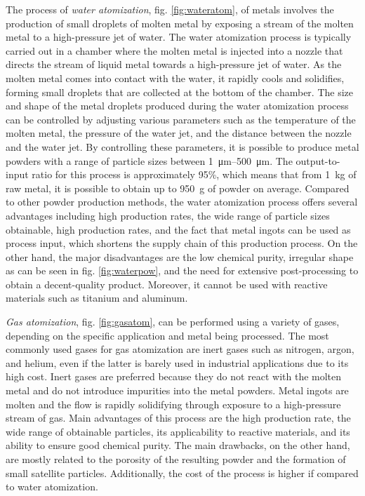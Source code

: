 The process of \emph{water atomization}, fig. \ref{fig:wateratom}, of metals involves the production of small droplets of molten metal by exposing a stream of the molten metal to a high-pressure jet of water. The water atomization process is typically carried out in a chamber where the molten metal is injected into a nozzle that directs the stream of liquid metal towards a high-pressure jet of water. As the molten metal comes into contact with the water, it rapidly cools and solidifies, forming small droplets that are collected at the bottom of the chamber. The size and shape of the metal droplets produced during the water atomization process can be controlled by adjusting various parameters such as the temperature of the molten metal, the pressure of the water jet, and the distance between the nozzle and the water jet. By controlling these parameters, it is possible to produce metal powders with a range of particle sizes between \SIrange[range-phrase = --]{1}{500}{\micro\metre}. The output-to-input ratio for this process is approximately 95\%, which means that from \SI{1}{\kilo\gram} of raw metal, it is possible to obtain up to \SI{950}{\gram} of powder on average. Compared to other powder production methods, the water atomization process offers several advantages including high production rates, the wide range of particle sizes obtainable, high production rates, and the fact that metal ingots can be used as process input, which shortens the supply chain of this production process. On the other hand, the major disadvantages are the low chemical purity, irregular shape as can be seen in fig. \ref{fig:waterpow}, and the need for extensive post-processing to obtain a decent-quality product. Moreover, it cannot be used with reactive materials such as titanium and aluminum.

\emph{Gas atomization}, fig. \ref{fig:gasatom}, can be performed using a variety of gases, depending on the specific application and metal being processed. The most commonly used gases for gas atomization are inert gases such as nitrogen, argon, and helium, even if the latter is barely used in industrial applications due to its high cost. Inert gases are preferred because they do not react with the molten metal and do not introduce impurities into the metal powders. Metal ingots are molten and the flow is rapidly solidifying through exposure to a high-pressure stream of gas. Main advantages of this process are the high production rate, the wide range of obtainable particles, its applicability to reactive materials, and its ability to ensure good chemical purity. The main drawbacks, on the other hand, are mostly related to the porosity of the resulting powder and the formation of small satellite particles. Additionally, the cost of the process is higher if compared to water atomization.

